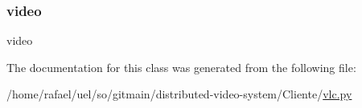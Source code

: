 \mbox{\label{classvlc_1_1_track_type_abb2fd43e6da5bee9edb1e75519db7a3d}} 
\subsubsection{\texorpdfstring{video}{video}}
{\footnotesize\ttfamily video\hspace{0.3cm}{\ttfamily [static]}}



The documentation for this class was generated from the following file\+:\begin{DoxyCompactItemize}
\item 
/home/rafael/uel/so/gitmain/distributed-\/video-\/system/\+Cliente/\hyperlink{vlc_8py}{vlc.\+py}\end{DoxyCompactItemize}
